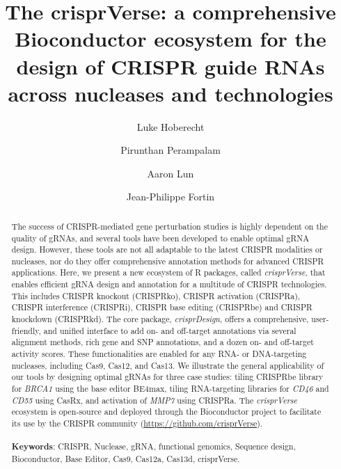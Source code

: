 \documentclass[pdftex,english,10pt]{article}
\begin{document}
\renewcommand\Affilfont{\small}


\title{The crisprVerse: a comprehensive Bioconductor ecosystem for the design of CRISPR guide RNAs across nucleases and technologies}
\author[1]{Luke Hoberecht}
\author[2]{Pirunthan Perampalam}
\author[1]{Aaron Lun}
\author[1,*]{Jean-Philippe Fortin}
\date{}






\let\oldthefootnote\thefootnote
\renewcommand{\thefootnote}{\fnsymbol{footnote}}
\let\thefootnote\oldthefootnote



\maketitle
\
\begin{abstract}
\noindent 
The success of CRISPR-mediated gene perturbation studies is highly dependent on the quality of gRNAs, and several tools have been developed to enable optimal gRNA design. 
However, these tools are not all adaptable to the latest CRISPR modalities or nucleases, nor do they offer comprehensive annotation methods for advanced CRISPR applications. 
Here, we present a new ecosystem of R packages, called \textit{crisprVerse}, that enables efficient gRNA design and annotation for a multitude of CRISPR technologies. This includes CRISPR knockout (CRISPRko), CRISPR activation (CRISPRa), CRISPR interference (CRISPRi), CRISPR base editing (CRISPRbe) and CRISPR knockdown (CRISPRkd). 
The core package, \textit{crisprDesign}, offers a comprehensive, user-friendly, and unified interface to add on- and off-target annotations via several alignment methods, rich gene and SNP annotations, and a dozen on- and off-target activity scores. These functionalities are enabled for any RNA- or DNA-targeting nucleases, including Cas9, Cas12, and Cas13. 
We illustrate the general applicability of our tools by designing optimal gRNAs for three case studies: tiling CRISPRbe library for \textit{BRCA1} using the base editor BE4max, tiling RNA-targeting libraries for \textit{CD46} and \textit{CD55} using CasRx, and activation of \textit{MMP7} using CRISPRa. 
The \textit{crisprVerse} ecosystem is open-source and deployed through the Bioconductor project to facilitate its use by the CRISPR community (\url{https://github.com/crisprVerse}).
\\
\\
\textbf{Keywords}: CRISPR, Nuclease, gRNA, functional genomics, Sequence design, Bioconductor, Base Editor, Cas9, Cas12a, Cas13d, crisprVerse. 
 \end{abstract}
\end{document}
